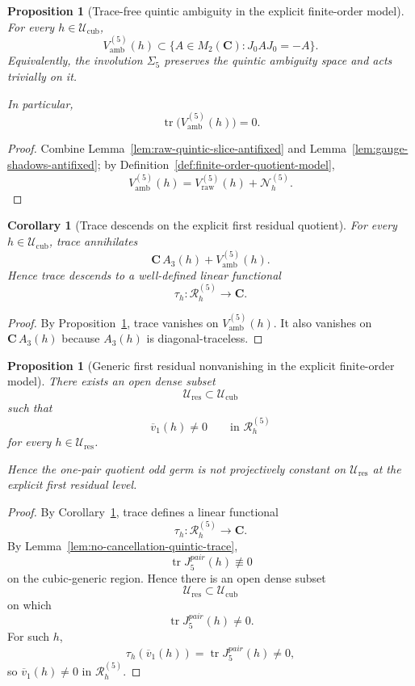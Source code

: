 \documentclass[11pt,a4paper]{amsart}
\def\pair{pair}%
\theoremstyle{plain}
\newtheorem{proposition}[theorem]{Proposition}
\newtheorem{corollary}[theorem]{Corollary}
\theoremstyle{definition}
\newcommand{\pair}{\mathrm{pair}}
\begin{document}
\begin{proposition}[Trace-free quintic ambiguity in the explicit finite-order model]
\label{prop:sigma-stability-quintic-ambiguity}
For every $h\in \mathcal U_{\mathrm{cub}}$,
\[
V_{\mathrm{amb}}^{(5)}(h)\subset
\{A\in M_2(\mathbf C):J_0AJ_0=-A\}.
\]
Equivalently, the involution $\Sigma_5$ preserves the quintic ambiguity
space and acts trivially on it.

In particular,
\[
\operatorname{tr}\bigl(V_{\mathrm{amb}}^{(5)}(h)\bigr)=0.
\]
\end{proposition}

\begin{proof}
Combine Lemma~\ref{lem:raw-quintic-slice-antifixed} and
Lemma~\ref{lem:gauge-shadows-antifixed}; by
Definition~\ref{def:finite-order-quotient-model},
\[
V_{\mathrm{amb}}^{(5)}(h)
=
V_{\mathrm{raw}}^{(5)}(h)+\mathcal N_h^{(5)}.
\]
\end{proof}

\begin{corollary}[Trace descends on the explicit first residual quotient]
\label{cor:trace-descends-explicit-first-residual}
For every $h\in \mathcal U_{\mathrm{cub}}$, trace annihilates
\[
\mathbf C\,A_3(h)+V_{\mathrm{amb}}^{(5)}(h).
\]
Hence trace descends to a well-defined linear functional
\[
\tau_h:\mathcal R_h^{(5)}\to \mathbf C.
\]
\end{corollary}

\begin{proof}
By Proposition~\ref{prop:sigma-stability-quintic-ambiguity}, trace vanishes on
$V_{\mathrm{amb}}^{(5)}(h)$. It also vanishes on $\mathbf C\,A_3(h)$
because $A_3(h)$ is diagonal-traceless.
\end{proof}

\begin{proposition}[Generic first residual nonvanishing in the explicit finite-order model]
\label{prop:first-residual-class-generic}
There exists an open dense subset
\[
\mathcal U_{\mathrm{res}}\subset \mathcal U_{\mathrm{cub}}
\]
such that
\[
\overline v_1(h)\neq 0
\qquad\text{in }\mathcal R_h^{(5)}
\]
for every $h\in \mathcal U_{\mathrm{res}}$.

Hence the one-pair quotient odd germ is not projectively constant on
$\mathcal U_{\mathrm{res}}$ at the explicit first residual level.
\end{proposition}

\begin{proof}
By Corollary~\ref{cor:trace-descends-explicit-first-residual}, trace defines a
linear functional
\[
\tau_h:\mathcal R_h^{(5)}\to\mathbf C.
\]
By Lemma~\ref{lem:no-cancellation-quintic-trace},
\[
\operatorname{tr}J_5^{\pair}(h)\not\equiv 0
\]
on the cubic-generic region. Hence there is an open dense subset
\[
\mathcal U_{\mathrm{res}}\subset \mathcal U_{\mathrm{cub}}
\]
on which
\[
\operatorname{tr}J_5^{\pair}(h)\neq 0.
\]
For such $h$,
\[
\tau_h(\overline v_1(h))
=
\operatorname{tr}J_5^{\pair}(h)\neq 0,
\]
so $\overline v_1(h)\neq 0$ in $\mathcal R_h^{(5)}$.
\end{proof}
\end{document}
